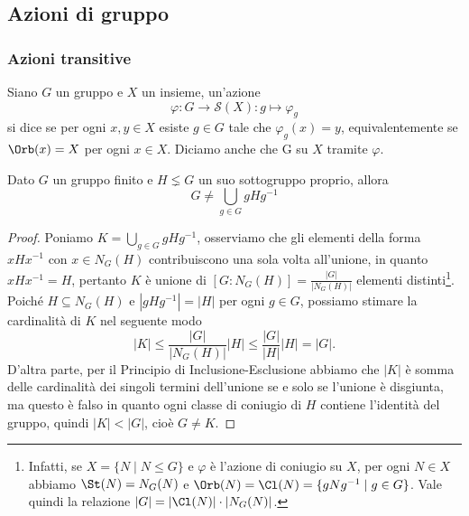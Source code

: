 \documentclass[11pt]{scrartcl}
\begin{document}
\newpage

\subsection{Azioni di gruppo}

\subsubsection{Azioni transitive}

\begin{definition}
    Siano $G$ un gruppo e $X$ un insieme, un'azione \[
        \varphi:G\longrightarrow \mathcal{S}(X) :g \longmapsto \varphi_g
    \]si dice  se per ogni $x, y \in X$ esiste $g \in G$
    tale che $\varphi_g(x) = y$, equivalentemente se $\Orb(x) = X$ per ogni 
    $x \in X$. Diciamo anche che G  su $X$ 
    tramite $\varphi$.
\end{definition}

\begin{lemma}
    \label{lemma1.40}
    Dato $G$ un gruppo finito e $H \lneq G$ un suo sottogruppo proprio, allora \[
        G \neq \bigcup_{g \in G}gHg^{-1}
    \]
\end{lemma}

\begin{proof}
    Poniamo $K = \displaystyle\bigcup_{g \in G}gHg^{-1}$, osserviamo che gli
    elementi della forma $xHx^{-1}$ con $x \in N_G(H)$ contribuiscono una
    sola volta all'unione, in quanto $xHx^{-1} = H$, pertanto $K$
    è unione di $[G:N_G(H)] = \displaystyle\frac{|G|}{|N_G(H)|}$ elementi distinti\footnote
    {Infatti, se $X = \{N\mid N\leqslant G\}$ e $\varphi$ è l'azione di coniugio
    su $X$, per ogni $N \in X$ abbiamo $\St(N) = N_G(N)$ e $\Orb(N) = \Cl(N) =
    \{gNg^{-1}\mid g \in G\}$. Vale quindi la relazione $|G| = |\Cl(N)|\cdot|N_G(N)|$.}. Poiché
    $H \subseteq N_G(H)$ e $|gHg^{-1}| = |H|$ per ogni $g \in G$, possiamo stimare 
    la cardinalità di $K$ nel seguente modo 
    \[
        |K| \leq\frac{|G|}{|N_G(H)|}|H| \leq\frac{|G|}{|H|}|H| = |G|.
    \]D'altra parte, per il Principio di Inclusione-Esclusione abbiamo che $|K|$ 
    è somma delle cardinalità dei singoli termini dell'unione se e solo se 
    l'unione è disgiunta, ma questo è falso in quanto ogni classe di coniugio
    di $H$ contiene l'identità del gruppo, quindi $|K| < |G|$, cioè $G \neq K$.
\end{proof}
\end{document}

